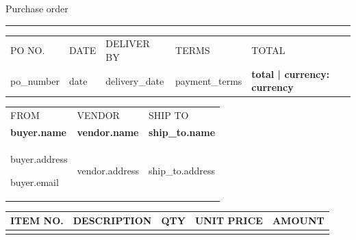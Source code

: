 \documentclass[10pt,a4paper]{article}
\newcommand{\fieldname}[1]{\textcolor{muted}{\scriptsize\MakeUppercase{#1}}}
\begin{document}
\color{ink}
{%
{\fontsize{30}{32}\selectfont Purchase order}\par\vspace{8pt}\textcolor{accent}{\rule{12mm}{2pt}}

\vspace{22pt}
{\renewcommand{\arraystretch}{1.2}
\begin{tabularx}{\linewidth}{@{}L L L L >{\raggedleft\arraybackslash}X@{}}
  \fieldname{PO no.} & \fieldname{Date} & \fieldname{Deliver by} & \fieldname{Terms} & \fieldname{Total} \\
  {{ po_number }} & {{ date }} & {{ delivery_date }} & {{ payment_terms }} & \textcolor{accent}{\bfseries {{ total | currency: currency }}}
\end{tabularx}}

\vspace{22pt}
\begin{tabularx}{\linewidth}{@{}L L L@{}}
  \fieldname{From} & \fieldname{Vendor} & \fieldname{Ship to} \\[2pt]
  {\bfseries\mbox{}{{ buyer.name }}} & {\bfseries\mbox{}{{ vendor.name }}} & {\bfseries\mbox{}{{ ship_to.name }}} \\
  {\small {{ buyer.address }}\par {{ buyer.email }}} & {\small {{ vendor.address }}} & {\small {{ ship_to.address }}}
\end{tabularx}

\vspace{26pt}
{\renewcommand{\arraystretch}{1.7}\setlength{\LTpre}{0pt}\setlength{\LTpost}{0pt}\setlength{\LTleft}{0pt}\setlength{\LTright}{0pt}
\begin{longtable}{@{}>{\raggedright\arraybackslash}p{24mm} >{\raggedright\arraybackslash}p{\dimexpr\linewidth-10\tabcolsep-24mm-12mm-22mm-22mm\relax} >{\raggedleft\arraybackslash}p{12mm} >{\raggedleft\arraybackslash}p{22mm} >{\raggedleft\arraybackslash}p{22mm}@{}}
  \fieldname{Item no.} & \fieldname{Description} & \fieldname{Qty} & \fieldname{Unit price} & \fieldname{Amount} \\
  \hline
\endhead
{%
  \hline
{%

}}
\end{longtable}}}
\end{document}
